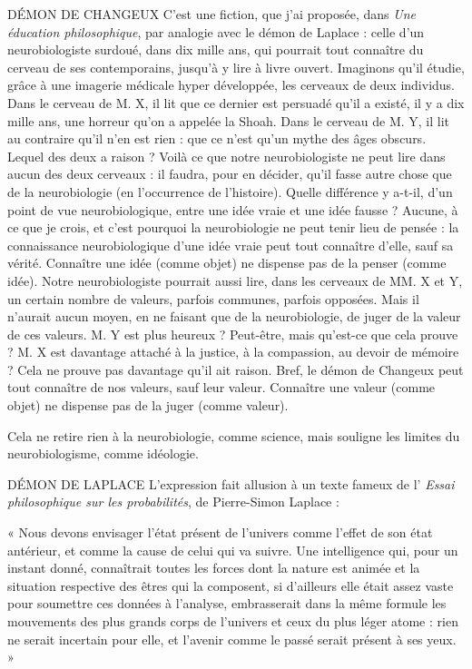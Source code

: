 DÉMON DE CHANGEUX C'est une fiction, que j'ai proposée, dans {\it Une
éducation philosophique}, par analogie avec le
démon de Laplace : celle d’un neurobiologiste surdoué, dans dix mille ans, qui
pourrait tout connaître du cerveau de ses contemporains, jusqu’à y lire à livre
ouvert. Imaginons qu’il étudie, grâce à une imagerie médicale hyper développée,
les cerveaux de deux individus. Dans le cerveau de M. X, il lit que ce
dernier est persuadé qu'il a existé, il y a dix mille ans, une horreur qu’on a
appelée la Shoah. Dans le cerveau de M. Y, il lit au contraire qu’il n’en est rien :
que ce n’est qu’un mythe des âges obscurs. Lequel des deux a raison ? Voilà
ce que notre neurobiologiste ne peut lire dans aucun des deux cerveaux : il
faudra, pour en décider, qu’il fasse autre chose que de la neurobiologie (en
l'occurrence de l’histoire). Quelle différence y a-t-il, d’un point de vue neurobiologique,
entre une idée vraie et une idée fausse ? Aucune, à ce que je crois,
et c’est pourquoi la neurobiologie ne peut tenir lieu de pensée : la connaissance
neurobiologique d’une idée vraie peut tout connaître d’elle, sauf sa vérité.
Connaître une idée (comme objet) ne dispense pas de la penser (comme idée).
Notre neurobiologiste pourrait aussi lire, dans les cerveaux de MM. X et Y,
un certain nombre de valeurs, parfois communes, parfois opposées. Mais il
n'aurait aucun moyen, en ne faisant que de la neurobiologie, de juger de la
valeur de ces valeurs. M. Y est plus heureux ? Peut-être, mais qu'est-ce que cela
prouve ? M. X est davantage attaché à la justice, à la compassion, au devoir de
mémoire ? Cela ne prouve pas davantage qu’il ait raison. Bref, le démon de
Changeux peut tout connaître de nos valeurs, sauf leur valeur. Connaître une
valeur (comme objet) ne dispense pas de la juger (comme valeur).

Cela ne retire rien à la neurobiologie, comme science, mais souligne les
limites du neurobiologisme, comme idéologie.

DÉMON DE LAPLACE L'expression fait allusion à un texte fameux de l’ {\it Essai
philosophique sur les probabilités}, de Pierre-Simon
Laplace :

\vspace{0.5cm}
{\footnotesize
« Nous devons envisager l’état présent de l’univers comme l'effet de son état antérieur,
et comme la cause de celui qui va suivre. Une intelligence qui, pour un instant
donné, connaîtrait toutes les forces dont la nature est animée et la situation respective
des êtres qui la composent, si d’ailleurs elle était assez vaste pour soumettre ces données
à l’analyse, embrasserait dans la même formule les mouvements des plus grands corps
de l’univers et ceux du plus léger atome : rien ne serait incertain pour elle, et l’avenir
comme le passé serait présent à ses yeux. »
}
\vspace{0.5cm}

